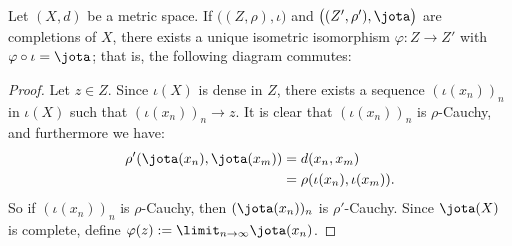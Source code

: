     \begin{theorem}\label{thm:unique-completion}
        Let $(X,d)$ be a metric space. If $\bigl((Z,\rho),\iota\bigr)$ and $\bigl((Z',\rho'),\jota\bigr)$ are completions of $X$, there exists a unique isometric isomorphism $\varphi:Z \rightarrow Z'$ with $\varphi \circ \iota = \jota$; that is, the following diagram commutes:
        \begin{center}
        \end{center}
            \begin{proof}
                Let $z \in Z$. Since $\iota(X)$ is dense in $Z$, there exists a sequence $(\iota(x_n))_n$ in $\iota(X)$ such that $(\iota(x_n))_n \rightarrow z$. It is clear that $(\iota(x_n))_n$ is $\rho$-Cauchy, and furthermore we have:
                    \begin{equation*}
                    \begin{split}
                        \rho'(\jota(x_n),\jota(x_m))
                        & = d(x_n,x_m) \\
                        & = \rho(\iota(x_n),\iota(x_m)).
                    \end{split}
                    \end{equation*}
                So if $(\iota(x_n))_n$ is $\rho$-Cauchy, then $(\jota(x_n))_n$ is $\rho'$-Cauchy. Since $\jota(X)$  is  complete, define $\varphi(z) := \limit_{n \rightarrow \infty}\jota(x_n)$.


\end{proof}
\end{theorem}
